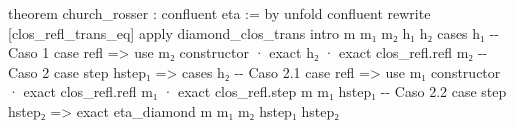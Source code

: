 \documentclass[
  spanish,
  letterpaper,
  DIV=11,
  numbers=noendperiod]{scrreprt}
\newenvironment{Shaded}{\begin{snugshade}}{\end{snugshade}}
\newcommand{\CommentTok}[1]{\textcolor[rgb]{0.37,0.37,0.37}{#1}}
\newcommand{\KeywordTok}[1]{\textcolor[rgb]{0.00,0.23,0.31}{\textbf{#1}}}
\newcommand{\NormalTok}[1]{\textcolor[rgb]{0.00,0.23,0.31}{#1}}
\renewcommand{\NormalTok}[1]{\textcolor[HTML]{000000}{#1}}
\renewcommand{\KeywordTok}[1]{\textcolor[HTML]{0000FF}{#1}}
\renewcommand{\CommentTok}[1]{\textcolor[HTML]{008000}{#1}}
\theoremstyle{remark}
\begin{document}
\begin{Shaded}
\begin{Highlighting}[]
\KeywordTok{theorem}\NormalTok{ church\_rosser : confluent eta := }\KeywordTok{by}
\NormalTok{  unfold confluent}
  \KeywordTok{rewrite}\NormalTok{ [clos\_refl\_trans\_eq]}
  \KeywordTok{apply}\NormalTok{ diamond\_clos\_trans}
\NormalTok{  intro m m₁ m₂ h₁ h₂}
\NormalTok{  cases h₁}
  \CommentTok{{-}{-} Caso 1}
\NormalTok{  case refl =\textgreater{}}
\NormalTok{    use m₂}
\NormalTok{    constructor}
\NormalTok{    · }\KeywordTok{exact}\NormalTok{ h₂}
\NormalTok{    · }\KeywordTok{exact}\NormalTok{ clos\_refl.refl m₂}
  \CommentTok{{-}{-} Caso 2}
\NormalTok{  case step hstep₁ =\textgreater{}}
\NormalTok{    cases h₂}
    \CommentTok{{-}{-} Caso 2.1}
\NormalTok{    case refl =\textgreater{}}
\NormalTok{      use m₁}
\NormalTok{      constructor}
\NormalTok{      · }\KeywordTok{exact}\NormalTok{ clos\_refl.refl m₁}
\NormalTok{      · }\KeywordTok{exact}\NormalTok{ clos\_refl.step m m₁ hstep₁}
    \CommentTok{{-}{-} Caso 2.2}
\NormalTok{    case step hstep₂ =\textgreater{}}
      \KeywordTok{exact}\NormalTok{ eta\_diamond m m₁ m₂ hstep₁ hstep₂}
\end{Highlighting}
\end{Shaded}
\end{document}
